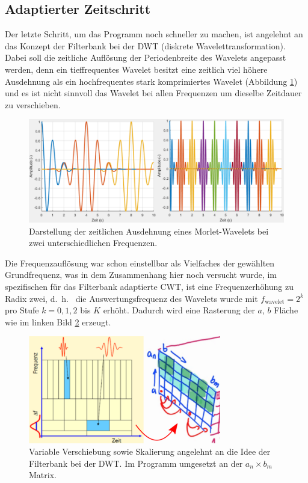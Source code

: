 \subsection{Adaptierter Zeitschritt
	\label{wavelets:subsection:AdaptierterZeitschritt}}
Der letzte Schritt, um das Programm noch schneller zu machen, ist
angelehnt an das Konzept der Filterbank bei der DWT (diskrete
Wavelettransformation).
Dabei soll die zeitliche Auflösung der Periodenbreite des Wavelets
angepasst werden, denn ein tieffrequentes Wavelet besitzt eine
zeitlich viel höhere Ausdehnung als ein hochfrequentes stark
komprimiertes Wavelet (Abbildung \ref{wavelet:fig:adaptedShift_b})
und es ist nicht sinnvoll das Wavelet bei allen Frequenzen um
dieselbe Zeitdauer zu verschieben.

\begin{figure}
	\centering
	\includegraphics[width=\textwidth]{papers/wavelets/images/15-1_adaptedShift-b.png}
	\caption{Darstellung der zeitlichen Ausdehnung eines Morlet-Wavelets
	bei zwei unterschiedlichen Frequenzen.}
	\label{wavelet:fig:adaptedShift_b}
\end{figure}

Die Frequenzauflösung war schon einstellbar als Vielfaches der
gewählten Grundfrequenz, was in dem Zusammenhang hier noch versucht
wurde, im spezifischen für das Filterbank adaptierte CWT, ist eine
Frequenzerhöhung zu Radix zwei, d.~h.~ die Auswertungsfrequenz des
Wavelets wurde mit $f_\text{wavelet} = 2^k$ pro Stufe $k = 0, 1,
2$ bis $K$ erhöht.
Dadurch wird eine Rasterung der $a$, $b$ Fläche wie im linken Bild
\ref{wavelet:fig:adaptedFrequndTime} erzeugt.

\begin{figure}
	\centering
	\includegraphics[width=0.75\textwidth]{papers/wavelets/images/15-2_adaptedFrequndTime.png}
	\caption{Variable Verschiebung sowie Skalierung angelehnt an die Idee der Filterbank bei der DWT.
Im Programm umgesetzt an der $a_n \times b_m$ Matrix.}
	\label{wavelet:fig:adaptedFrequndTime}
\end{figure}

